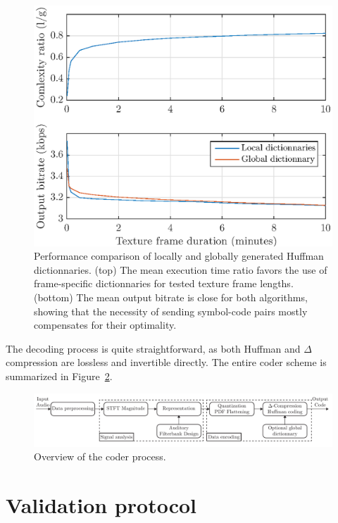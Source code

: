 \documentclass[final,3p,times,twocolumn]{elsarticle}
\begin{document}
\begin{figure}[htbp]
	\centering
		\includegraphics[width=\columnwidth]{figures/dict_comp.eps}
	\caption{Performance comparison of locally and globally generated Huffman dictionnaries. (top) The mean execution time ratio favors the use of frame-specific dictionnaries for tested texture frame lengths. (bottom) The mean output bitrate is close for both algorithms, showing that the necessity of sending symbol-code pairs mostly compensates for their optimality.}
	\label{fig:dict_comp}
\end{figure}

The decoding process is quite straightforward, as both Huffman and $\Delta$ compression are lossless and invertible directly. The entire coder scheme is summarized in Figure~\ref{fig:scheme}.

\begin{figure}[htbp]
	\centering
		\includegraphics[width=1\textwidth]{figures/scheme.pdf}
	\caption{Overview of the coder process.}
	\label{fig:scheme}
\end{figure}

\section{Validation protocol} \label{sec:protocol}
\end{document}
